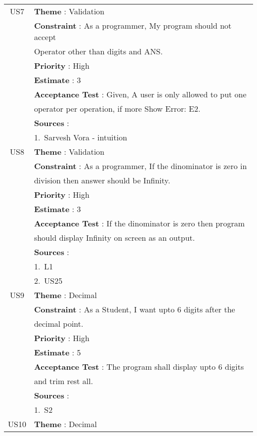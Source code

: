 \documentclass{article}
\begin{document}
\begin{longtable}{|| c || l ||}
         \hline
         US7 & \textbf{Theme} : Validation \\
         & \textbf{Constraint} : As a programmer, My program should not accept \\ 
         & Operator other than digits and ANS. \\
         & \textbf{Priority} : High \\
         & \textbf{Estimate} : 3 \\
         & \textbf{Acceptance Test} : Given, A user is only allowed to put one \\
         & operator per operation, if more Show Error: E2.\\
         & \textbf{Sources} : \\
         & 1.~Sarvesh Vora - intuition \\
         \hline
         US8 & \textbf{Theme} : Validation \\
         & \textbf{Constraint} : As a programmer, If the dinominator is zero in \\ 
         & division then answer should be Infinity.\\
         & \textbf{Priority} : High \\
         & \textbf{Estimate} : 3 \\
         & \textbf{Acceptance Test} : If the dinominator is zero then program \\ 
         & should display Infinity on screen as an output.\\
         & \textbf{Sources} : \\
         & 1.~L1 \\
         & 2.~US25 \\
         \hline
         \newpage
         \hline
         US9 & \textbf{Theme} : Decimal \\
         & \textbf{Constraint} : As a Student, I want upto 6 digits after the \\ 
         & decimal point. \\ 
         & \textbf{Priority} : High \\
         & \textbf{Estimate} : 5 \\
         & \textbf{Acceptance Test} : The program shall display upto 6 digits \\ 
         & and trim rest all. \\
         & \textbf{Sources} : \\
         & 1.~S2 \\
         \hline
         US10 & \textbf{Theme} : Decimal \\

\end{longtable}
\end{document}
